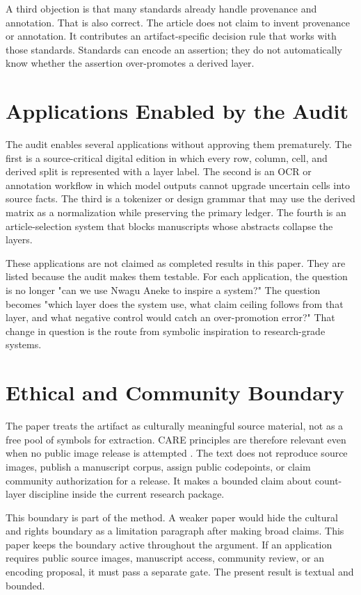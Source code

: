 \documentclass[sigconf,nonacm]{acmart}
\begin{document}
A third objection is that many standards already handle provenance and
annotation. That is also correct. The article does not claim to invent
provenance or annotation. It contributes an artifact-specific decision rule that
works with those standards. Standards can encode an assertion; they do not
automatically know whether the assertion over-promotes a derived layer.

\section{Applications Enabled by the Audit}
The audit enables several applications without approving them prematurely. The
first is a source-critical digital edition in which every row, column, cell, and
derived split is represented with a layer label. The second is an OCR or
annotation workflow in which model outputs cannot upgrade uncertain cells into
source facts. The third is a tokenizer or design grammar that may use the
derived matrix as a normalization while preserving the primary ledger. The
fourth is an article-selection system that blocks manuscripts whose abstracts
collapse the layers.

These applications are not claimed as completed results in this paper. They are
listed because the audit makes them testable. For each application, the question
is no longer "can we use Nwagu Aneke to inspire a system?" The question becomes
"which layer does the system use, what claim ceiling follows from that layer,
and what negative control would catch an over-promotion error?" That change in
question is the route from symbolic inspiration to research-grade systems.

\section{Ethical and Community Boundary}
The paper treats the artifact as culturally meaningful source material, not as a
free pool of symbols for extraction. CARE principles are therefore relevant even
when no public image release is attempted \cite{carroll2020care}. The text
does not reproduce source images, publish a manuscript corpus, assign public
codepoints, or claim community authorization for a release. It makes a bounded
claim about count-layer discipline inside the current research package.

This boundary is part of the method. A weaker paper would hide the cultural and
rights boundary as a limitation paragraph after making broad claims. This paper
keeps the boundary active throughout the argument. If an application requires
public source images, manuscript access, community review, or an encoding
proposal, it must pass a separate gate. The present result is textual and
bounded.
\end{document}
